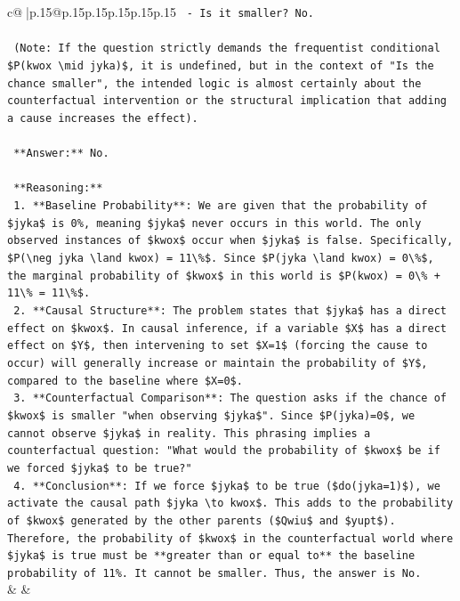 \documentclass{article}
\begin{document}
{\begin{supertabular}{c@{$\;$}|p{.15\linewidth}@{}p{.15\linewidth}p{.15\linewidth}p{.15\linewidth}p{.15\linewidth}p{.15\linewidth}}
{{{\texttt{    {-} Is it smaller? No.} \\
\\ 
\texttt{    (Note: If the question strictly demands the frequentist conditional \$P(kwox \textbackslash{}mid jyka)\$, it is undefined, but in the context of "Is the chance smaller", the intended logic is almost certainly about the counterfactual intervention or the structural implication that adding a cause increases the effect).} \\
\\ 
\texttt{    **Answer:** No.} \\
\\ 
\texttt{    **Reasoning:**} \\
\texttt{    1.  **Baseline Probability**: We are given that the probability of \$jyka\$ is 0\%, meaning \$jyka\$ never occurs in this world. The only observed instances of \$kwox\$ occur when \$jyka\$ is false. Specifically, \$P(\textbackslash{}neg jyka \textbackslash{}land kwox) = 11\textbackslash{}\%\$. Since \$P(jyka \textbackslash{}land kwox) = 0\textbackslash{}\%\$, the marginal probability of \$kwox\$ in this world is \$P(kwox) = 0\textbackslash{}\% + 11\textbackslash{}\% = 11\textbackslash{}\%\$.} \\
\texttt{    2.  **Causal Structure**: The problem states that \$jyka\$ has a direct effect on \$kwox\$. In causal inference, if a variable \$X\$ has a direct effect on \$Y\$, then intervening to set \$X=1\$ (forcing the cause to occur) will generally increase or maintain the probability of \$Y\$, compared to the baseline where \$X=0\$.} \\
\texttt{    3.  **Counterfactual Comparison**: The question asks if the chance of \$kwox\$ is smaller "when observing \$jyka\$". Since \$P(jyka)=0\$, we cannot observe \$jyka\$ in reality. This phrasing implies a counterfactual question: "What would the probability of \$kwox\$ be if we forced \$jyka\$ to be true?"} \\
\texttt{    4.  **Conclusion**: If we force \$jyka\$ to be true (\$do(jyka=1)\$), we activate the causal path \$jyka \textbackslash{}to kwox\$. This adds to the probability of \$kwox\$ generated by the other parents (\$Qwiu\$ and \$yupt\$). Therefore, the probability of \$kwox\$ in the counterfactual world where \$jyka\$ is true must be **greater than or equal to** the baseline probability of 11\%. It cannot be smaller. Thus, the answer is No.} \\
            }
        }
    }
    & & \\ \\


\end{supertabular}}
\end{document}
